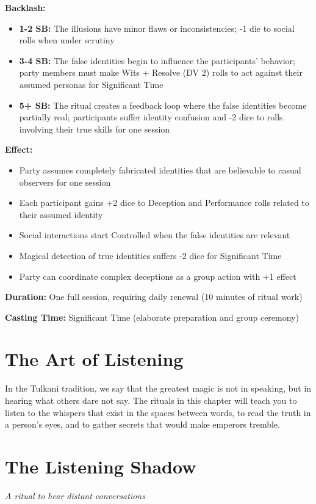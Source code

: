 \textbf{Backlash:}
\begin{itemize}
\item \textbf{1-2 SB:} The illusions have minor flaws or inconsistencies; -1 die to social rolls when under scrutiny
\item \textbf{3-4 SB:} The false identities begin to influence the participants' behavior; party members must make Wits + Resolve (DV 2) rolls to act against their assumed personas for Significant Time
\item \textbf{5+ SB:} The ritual creates a feedback loop where the false identities become partially real; participants suffer identity confusion and -2 dice to rolls involving their true skills for one session
\end{itemize}

\textbf{Effect:}
\begin{itemize}
\item Party assumes completely fabricated identities that are believable to casual observers for one session
\item Each participant gains +2 dice to Deception and Performance rolls related to their assumed identity
\item Social interactions start Controlled when the false identities are relevant
\item Magical detection of true identities suffers -2 dice for Significant Time
\item Party can coordinate complex deceptions as a group action with +1 effect
\end{itemize}

\textbf{Duration:} One full session, requiring daily renewal (10 minutes of ritual work)

\textbf{Casting Time:} Significant Time (elaborate preparation and group ceremony)

\section*{The Art of Listening}

In the Tulkani tradition, we say that the greatest magic is not in speaking, but in hearing what others dare not say. The rituals in this chapter will teach you to listen to the whispers that exist in the spaces between words, to read the truth in a person's eyes, and to gather secrets that would make emperors tremble.

\section*{The Listening Shadow}
\textit{A ritual to hear distant conversations}

